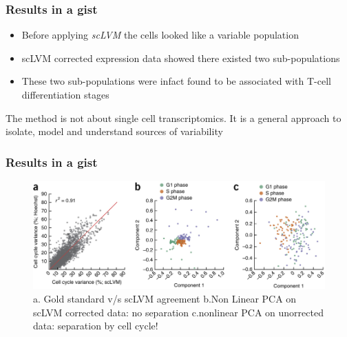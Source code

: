 \documentclass[10pt, compress]{beamer}
\renewcommand{\(}{\begin{columns}}
\renewcommand{\)}{\end{columns}}
\newcommand{\<}[1]{\begin{column}{#1}}
\renewcommand{\>}{\end{column}}
\begin{document}
\begin{frame}
\frametitle{Results in a gist}
\begin{itemize}
\item Before applying \textit{scLVM} the cells looked like a variable population
\item scLVM corrected expression data showed there existed two sub-populations
\item These two sub-populations were infact found to be associated with T-cell differentiation stages
\end{itemize}
The method is not about single cell transcriptomics. It is a general approach to isolate, model and understand sources of variability
\end{frame}

\begin{frame}
\frametitle{Results in a gist}
\begin{figure}
\includegraphics[width=0.8\linewidth]{images/results1.jpg}
\caption{a. Gold standard v/s scLVM agreement
b.Non Linear PCA on scLVM corrected data: no separation c.nonlinear PCA on unorrected data: separation by cell cycle!}
\end{figure}
\end{frame}

\end{document}
